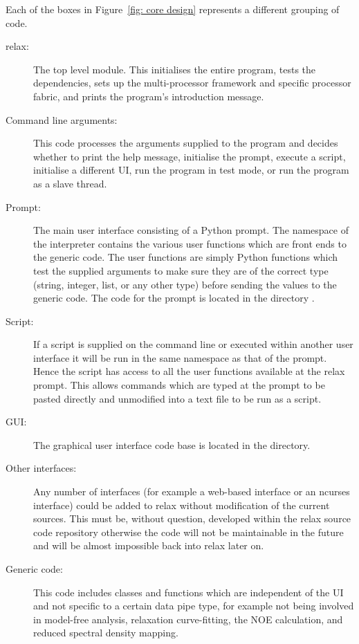 Each of the boxes in Figure~\ref{fig: core design} represents a different grouping of code.
\begin{description}
  \item[relax:]  The top level module.
    This initialises the entire program, tests the dependencies, sets up the multi-processor framework and specific processor fabric, and prints the program's introduction message.
  \item[Command line arguments:]  This code processes the arguments supplied to the program and decides whether to print the help message, initialise the prompt, execute a script, initialise a different UI, run the program in test mode, or run the program as a slave thread.
  \item[Prompt:]  The main user interface consisting of a Python prompt.
    The namespace of the interpreter contains the various user functions which are front ends to the generic code.
    The user functions are simply Python functions which test the supplied arguments to make sure they are of the correct type (string, integer, list, or any other type) before sending the values to the generic code.
    The code for the prompt is located in the directory .
  \item[Script:]  If a script is supplied on the command line or executed within another user interface it will be run in the same namespace as that of the prompt.
    Hence the script has access to all the user functions available at the relax prompt.
    This allows commands which are typed at the prompt to be pasted directly and unmodified into a text file to be run as a script.
  \item[GUI:]  The graphical user interface code base is located in the  directory.
  \item[Other interfaces:]  Any number of interfaces (for example a web-based interface or an ncurses interface) could be added to relax without modification of the current sources.
    This must be, without question, developed within the relax source code repository otherwise the code will not be maintainable in the future and will be almost impossible back into relax later on.
  \item[Generic code:]  This code includes classes and functions which are independent of the UI and not specific to a certain data pipe type, for example not being involved in model-free analysis, relaxation curve-fitting, the NOE calculation, and reduced spectral density mapping.

\end{description}
